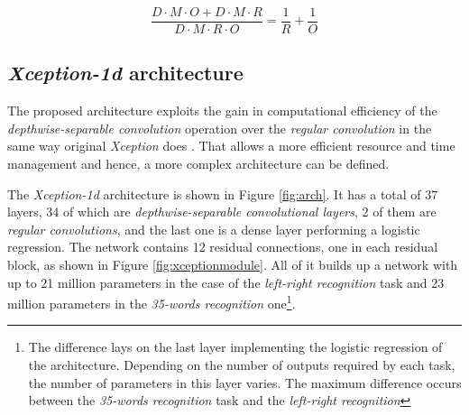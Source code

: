 $$ \frac{D \cdot M \cdot O  + D \cdot M \cdot R} {D \cdot M \cdot R \cdot O} = \frac{1}{R} + \frac{1}{O} $$



\subsection{\textit{Xception-1d} architecture}
The proposed architecture exploits the gain in computational efficiency of the \textit{depthwise-separable convolution} operation over the \textit{regular convolution} in the same way original \textit{Xception} does \autocite{chollet2017}. That allows a more efficient resource and time management and hence, a more complex architecture can be defined.

The \textit{Xception-1d} architecture is shown in Figure \ref{fig:arch}. It has a total of 37 layers, 34 of which are \textit{depthwise-separable convolutional layers}, 2 of them are \textit{regular convolutions}, and the last one is a dense layer performing a logistic regression. The network contains 12 residual connections, one in each residual block, as shown in Figure \ref{fig:xceptionmodule}. All of it builds up a network with up to 21 million parameters in the case of the \textit{left-right recognition}  task and 23 million parameters in the \textit{35-words recognition} one\footnote{The difference lays on the last layer implementing the logistic regression of the architecture. Depending on the number of outputs required by each task, the number of parameters in this layer varies. The maximum difference occurs between the \textit{35-words recognition} task and the \textit{left-right recognition}}.

